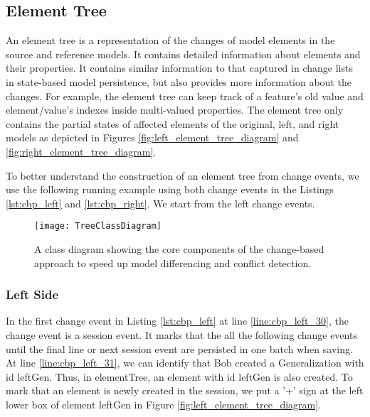 \subsection{Element Tree}
\label{sec:tree_construction}
An element tree is a representation of the changes of model elements in the source and reference models. It contains detailed information about elements and their properties. It contains similar information to that captured in change lists in state-based model persistence, but also provides more information about the changes. For example, the element tree can keep track of a feature's old value and element/value's indexes inside multi-valued properties. The element tree only contains the partial states of affected elements of the original, left, and right models as depicted in Figures \ref{fig:left_element_tree_diagram} and \ref{fig:right_element_tree_diagram}.

To better understand the construction of an element tree from change events, we use the following running example using both change events in the Listings \ref{lst:cbp_left} and \ref{lst:cbp_right}. We start from the left change events. 

\begin{landscape}
  \begin{figure}
    \texttt{[image: TreeClassDiagram]}
    \caption{A class diagram showing the core components of the change-based approach to speed up model differencing and conflict detection.}
    \label{fig:approach_class_diagram}
  \end{figure}
\end{landscape}

\subsubsection{Left Side}\label{sec:left_side}
In the first change event in Listing \ref{lst:cbp_left} at line \ref{line:cbp_left_30}, the change event is a \textsf{session} event. It marks that the all the following change events until the final line or next \textsf{session} event are persisted in one batch when saving. At line \ref{line:cbp_left_31}, we can identify that Bob created a \textsf{Generalization} with id \textsf{leftGen}. Thus, in \textsf{elementTree}, an element with id \textsf{leftGen} is also created. To mark that an element is newly created in the session, we put a '+' sign at the left lower box of element \textsf{leftGen} in Figure \ref{fig:left_element_tree_diagram}.

